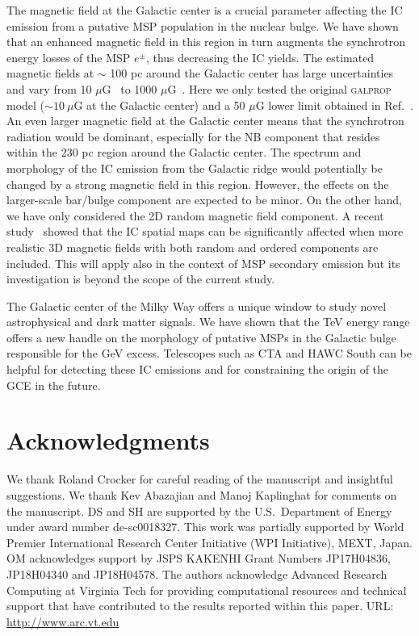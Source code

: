 \documentclass[doublespace,nopageskip]{VTthesis} %
\begin{document}
The magnetic field at the Galactic center is a crucial parameter affecting the IC emission from a putative MSP population in the nuclear bulge. We have shown that an enhanced magnetic field in this region in turn augments the synchrotron energy losses of the MSP $e^\pm$, thus decreasing the IC yields. The estimated magnetic fields at $\sim$ 100 pc around the Galactic center has large uncertainties and vary from 10 $\mu$G~\cite{2005ApJ...626L..23L} to 1000 $\mu$G~\cite{1989ApJ...343..703M}. Here we only tested the original \textsc{galprop} model ($\sim 10\ \mu$G at the Galactic center) and a 50 $\mu$G lower limit obtained in Ref.~\cite{2010Natur.463...65C}. An even larger magnetic field at the Galactic center means that the synchrotron radiation would be dominant, especially for the NB component that resides within the 230 pc region around the Galactic center. The spectrum and morphology of the IC emission from the Galactic ridge would potentially be changed by a strong magnetic field in this region. However, the effects on the larger-scale bar/bulge component are expected to be minor. On the other hand, we have only considered the 2D random magnetic field component. A recent study~\cite{2019PhRvD..99d3007O} showed that the IC spatial maps can be significantly affected when more realistic 3D magnetic fields with both random and ordered components are included. This will apply also in the context of MSP secondary emission but its investigation is beyond the scope of the current study.

The Galactic center of the Milky Way offers a unique window to study novel astrophysical and dark matter signals. We have shown that the TeV energy range offers a new handle on the morphology of putative MSPs in the Galactic bulge responsible for the GeV excess. Telescopes such as CTA and HAWC South can be helpful for detecting these IC emissions and for constraining the origin of the GCE in the future.

\section*{Acknowledgments}
We thank Roland Crocker for careful reading of the manuscript and insightful suggestions. We thank Kev Abazajian and  Manoj Kaplinghat for comments on the manuscript. DS and SH are supported by the U.S.~Department of Energy under award number de-sc0018327. This work was partially supported by World Premier International Research Center Initiative (WPI Initiative), MEXT, Japan. OM acknowledges support by JSPS KAKENHI Grant Numbers JP17H04836, JP18H04340 and JP18H04578. The authors acknowledge Advanced Research Computing at Virginia Tech for providing computational resources and technical support that have contributed to the results reported within this paper. URL: \url{http://www.arc.vt.edu}
\end{document}
